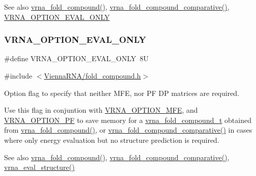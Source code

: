 \begin{DoxySeeAlso}{See also}
\hyperlink{group__fold__compound_ga6601d994ba32b11511b36f68b08403be}{vrna\+\_\+fold\+\_\+compound()}, \hyperlink{group__fold__compound_gad6bacc816af274922b13d947f708aa0c}{vrna\+\_\+fold\+\_\+compound\+\_\+comparative()}, \hyperlink{group__fold__compound_ga61469c423131552c8483229f8b6c7e0e}{V\+R\+N\+A\+\_\+\+O\+P\+T\+I\+O\+N\+\_\+\+E\+V\+A\+L\+\_\+\+O\+N\+LY} 
\end{DoxySeeAlso}
\mbox{\label{group__fold__compound_ga61469c423131552c8483229f8b6c7e0e}} 
\subsubsection{\texorpdfstring{V\+R\+N\+A\+\_\+\+O\+P\+T\+I\+O\+N\+\_\+\+E\+V\+A\+L\+\_\+\+O\+N\+LY}{VRNA\_OPTION\_EVAL\_ONLY}}
{\footnotesize\ttfamily \#define V\+R\+N\+A\+\_\+\+O\+P\+T\+I\+O\+N\+\_\+\+E\+V\+A\+L\+\_\+\+O\+N\+LY~8U}



{\ttfamily \#include $<$\hyperlink{fold__compound_8h}{Vienna\+R\+N\+A/fold\+\_\+compound.\+h}$>$}



Option flag to specify that neither M\+FE, nor PF DP matrices are required. 

Use this flag in conjuntion with \hyperlink{group__fold__compound_gae63be9127fe7dcc1f9bb14f5bb1064ee}{V\+R\+N\+A\+\_\+\+O\+P\+T\+I\+O\+N\+\_\+\+M\+FE}, and \hyperlink{group__fold__compound_gabfbadcddda3e74ce7f49035ef8f058f7}{V\+R\+N\+A\+\_\+\+O\+P\+T\+I\+O\+N\+\_\+\+PF} to save memory for a \hyperlink{group__fold__compound_ga1b0cef17fd40466cef5968eaeeff6166}{vrna\+\_\+fold\+\_\+compound\+\_\+t} obtained from \hyperlink{group__fold__compound_ga6601d994ba32b11511b36f68b08403be}{vrna\+\_\+fold\+\_\+compound()}, or \hyperlink{group__fold__compound_gad6bacc816af274922b13d947f708aa0c}{vrna\+\_\+fold\+\_\+compound\+\_\+comparative()} in cases where only energy evaluation but no structure prediction is required.

\begin{DoxySeeAlso}{See also}
\hyperlink{group__fold__compound_ga6601d994ba32b11511b36f68b08403be}{vrna\+\_\+fold\+\_\+compound()}, \hyperlink{group__fold__compound_gad6bacc816af274922b13d947f708aa0c}{vrna\+\_\+fold\+\_\+compound\+\_\+comparative()}, \hyperlink{group__eval_ga58f199f1438d794a265f3b27fc8ea631}{vrna\+\_\+eval\+\_\+structure()} 
\end{DoxySeeAlso}


